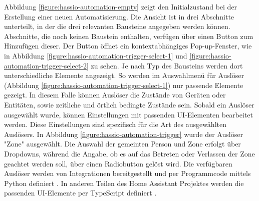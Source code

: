 Abbildung \ref{figure:hassio-automation-empty} zeigt den Initialzustand bei der Erstellung einer
neuen Automatisierung. Die Ansicht ist in drei Abschnitte unterteilt, in der die drei relevanten
Bausteine angegeben werden können. Abschnitte, die noch keinen Baustein enthalten, verfügen über
einen Button zum Hinzufügen dieser. Der Button öffnet ein kontextabhängiges Pop-up-Fenster, wie in
Abbildung \ref{figure:hassio-automation-trigger-select-1} und
\ref{figure:hassio-automation-trigger-select-2} zu sehen. Je nach Typ des Bausteins werden dort
unterschiedliche Elemente angezeigt. So werden im Auswahlmenü für Auslöser (Abbildung
\ref{figure:hassio-automation-trigger-select-1}) nur passende Elemente gezeigt. In diesem Falle
können Auslöser die Zustände von Geräten oder Entitäten, sowie zeitliche und örtlich bedingte
Zustände sein. Sobald ein Auslöser ausgewählt wurde, können Einstellungen mit passenden UI-Elementen
bearbeitet werden. Diese Einstellungen sind spezifisch für die Art des ausgewählten Auslösers. In
Abbildung \ref{figure:hassio-automation-trigger} wurde der Auslöser "Zone" ausgewählt. Die Auswahl
der gemeinten Person und Zone erfolgt über Dropdowns, während die Angabe, ob es auf das Betreten
oder Verlassen der Zone geachtet werden soll, über einen Radiobutton gelöst wird.  Die verfügbaren Auslöser werden von Integrationen bereitgestellt
und per Programmcode mittels Python definiert \parencite{homeassistantDeviceAutomations2023}. In
anderen Teilen des Home Assistant Projektes werden die passenden \ac{UI}-Elemente per TypeScript
definiert \parencite{homeassistantHomeassistantFrontend}.


